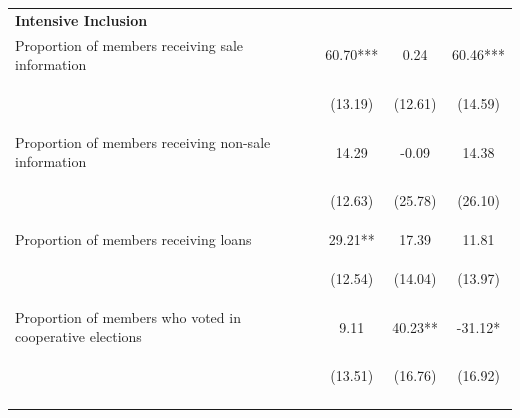 \documentclass[11pt]{article}
\begin{document}
\begin{table}[H]
{\begin{tabularx}{1.1\linewidth}{lccc}
 
 \textbf{Intensive Inclusion} & & & \\
\noalign{\smallskip}Proportion of members receiving sale information & 60.70*** & 0.24 & 60.46***\\
 & \begin{footnotesize}(13.19)\end{footnotesize} & \begin{footnotesize}(12.61)\end{footnotesize} & \begin{footnotesize}(14.59)\end{footnotesize}\\
\noalign{\smallskip}Proportion of members receiving non-sale information & 14.29 & -0.09 & 14.38\\
 & \begin{footnotesize}(12.63)\end{footnotesize} & \begin{footnotesize}(25.78)\end{footnotesize} & \begin{footnotesize}(26.10)\end{footnotesize}\\
\noalign{\smallskip}Proportion of members receiving loans & 29.21** & 17.39 & 11.81\\
 & \begin{footnotesize}(12.54)\end{footnotesize} & \begin{footnotesize}(14.04)\end{footnotesize} & \begin{footnotesize}(13.97)\end{footnotesize}\\
\noalign{\smallskip}Proportion of members who voted in cooperative elections & 9.11 & 40.23** & -31.12*\\
 & \begin{footnotesize}(13.51)\end{footnotesize} & \begin{footnotesize}(16.76)\end{footnotesize} & \begin{footnotesize}(16.92)\end{footnotesize}\\
 \noalign{\smallskip}\hline
  \end{tabularx}}
\end{table}
\doublespacing
\end{document}
